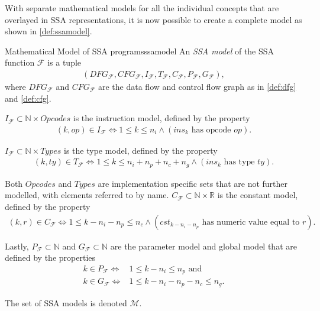     With separate mathematical models for all the individual concepts that are
    overlayed in SSA representations, it is now possible to create a complete
    model as shown in \autoref{def:ssamodel}.

\begin{definition}{Mathematical Model of SSA programs}{ssamodel}
    An {\em SSA model} of the SSA function $\mathcal F$ is a tuple
    \begin{align*}
        (DFG_\mathcal{F}, CFG_\mathcal{F},I_\mathcal{F},T_\mathcal{F},C_\mathcal{F},P_\mathcal{F},G_\mathcal{F}),
    \end{align*}
    where $DFG_\mathcal{F}$ and $CFG_\mathcal{F}$ are the data flow and control
    flow graph as in \autoref{def:dfg} and \autoref{def:cfg}.

    $I_\mathcal F\subset\mathbb N\times Opcodes$ is the instruction model, defined by the property
    \begin{align*}
        (k,op)\in I_\mathcal F\iff 1\leq k\leq n_i\land(ins_k\text{ has opcode }op).
    \end{align*}

    $I_\mathcal F\subset\mathbb N\times Types$ is the type model, defined by the property
    \begin{align*}
        (k,ty)\in T_\mathcal F\iff 1\leq k\leq n_i+n_p+n_c+n_g\land(ins_k\text{ has type }ty).
    \end{align*}

    Both $Opcodes$ and $Types$ are implementation specific sets that are not
    further modelled, with elements referred to by name.
    $C_\mathcal F\subset\mathbb N\times\mathbb R$ is the constant model, defined
    by the property
    \begin{align*}
        (k,r)\in C_\mathcal F\iff 1\leq k-n_i-n_p\leq n_c\land(cst_{k-n_i-n_p}\text{ has numeric value equal to }r).
    \end{align*}

    Lastly, $P_\mathcal F\subset\mathbb N$ and $G_\mathcal F\subset\mathbb N$
    are the parameter model and global model that are defined by the properties
    \begin{align*}
        k\in P_\mathcal F\iff& 1\leq k-n_i\leq n_p\text{ and}\\
        k\in G_\mathcal F\iff& 1\leq k-n_i-n_p-n_c\leq n_g.
    \end{align*}

    The set of SSA models is denoted $\mathcal M$.
\end{definition}


